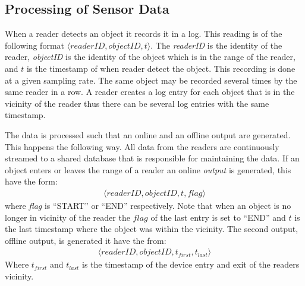 \subsection{Processing of Sensor Data}
When a reader detects an object it records it in a log. 
This reading is of the following format $\langle readerID,objectID,t\rangle$.
The \textit{readerID} is the identity of the reader, \textit{objectID} is the identity of the object which is in the range of the reader, and $t$ is the timestamp of when reader detect the object.
This recording is done at a given sampling rate. 
The same object may be recorded several times by the same reader in a row. 
A reader creates a log entry for each object that is in the vicinity of the reader thus there can be several log entries with the same timestamp.

The data is processed such that an online and an offline output are generated.
This happens the following way.
All data from the readers are continuously streamed to a shared database that is responsible for maintaining the data.
If an object enters or leaves the range of a reader an online \textit{output} is generated, this have the form:
\begin{align}
\label{log:online}
\langle readerID,objectID,t,flag \rangle
\end{align}
where \textit{flag} is ``START'' or ``END'' respectively. 
Note that when an object is no longer in vicinity of the reader the $flag$ of the last entry is set to ``END'' and $t$ is the last timestamp where the object was within the vicinity.
The second output, offline output, is generated it have the from:
\begin{align}
\label{log:offline}
\langle readerID,objectID,t_{first},t_{last} \rangle
\end{align}
Where $t_{first}$ and $t_{last}$ is the timestamp of the device entry and exit of the readers vicinity.

 
